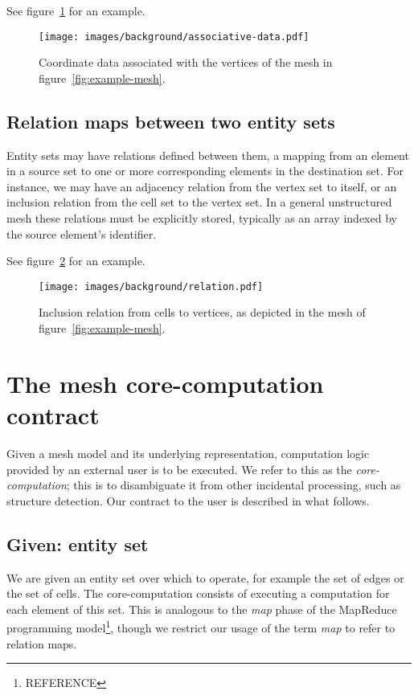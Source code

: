See figure~\ref{fig:associative-data} for an example.

\begin{figure}
    \texttt{[image: images/background/associative-data.pdf]}
    \caption{Coordinate data associated with the vertices of the mesh in figure~\ref{fig:example-mesh}.}
    \label{fig:associative-data}
\end{figure}


\subsection{Relation maps between two entity sets}
Entity sets may have relations defined between them, a mapping from an element in a source set to one or more corresponding elements in the destination set. For instance, we may have an adjacency relation from the vertex set to itself, or an inclusion relation from the cell set to the vertex set.
In a general unstructured mesh these relations must be explicitly stored, typically as an array indexed by the source element's identifier.

See figure~\ref{fig:relation} for an example.

\begin{figure}
    \texttt{[image: images/background/relation.pdf]}
    \caption{Inclusion relation from cells to vertices, as depicted in the mesh of figure~\ref{fig:example-mesh}.}
    \label{fig:relation}
\end{figure}




\section{The mesh core-computation contract}
Given a mesh model and its underlying representation, computation logic provided by an external user is to be executed. We refer to this as the \emph{core-computation}; this is to disambiguate it from other incidental processing, such as structure detection.
Our contract to the user is described in what follows.

\subsection{Given: entity set}
We are given an entity set over which to operate, for example the set of edges or the set of cells. The core-computation consists of executing a computation for each element of this set. This is analogous to the \emph{map} phase of the MapReduce programming model\footnote{REFERENCE}, though we restrict our usage of the term \emph{map} to refer to relation maps.

